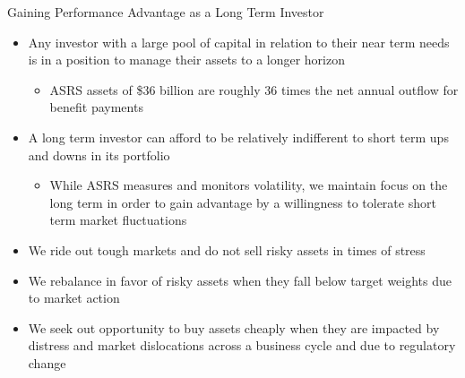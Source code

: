 \documentclass[10pt,english]{beamer}\usepackage[]{graphicx}\usepackage[]{color}
\begin{document}
%
\begin{frame}{Gaining Performance Advantage as a Long Term Investor}
\begin{itemize}
\item Any investor with a large pool of capital in relation to their near
term needs is in a position to manage their assets to a longer horizon
\begin{itemize}
\item ASRS assets of \$36 billion are roughly 36 times the net annual outflow
for benefit payments
\end{itemize}
\item A long term investor can afford to be relatively indifferent to short
term ups and downs in its portfolio
\begin{itemize}
\item While ASRS measures and monitors volatility, we maintain focus on
the long term in order to gain advantage by a willingness to tolerate
short term market fluctuations
\end{itemize}
\item We ride out tough markets and do not sell risky assets in times of
stress
\item We rebalance in favor of risky assets when they fall below target
weights due to market action
\item We seek out opportunity to buy assets cheaply when they are impacted
by distress and market dislocations across a business cycle and due
to regulatory change
\end{itemize}
\end{frame}
%
\end{document}
